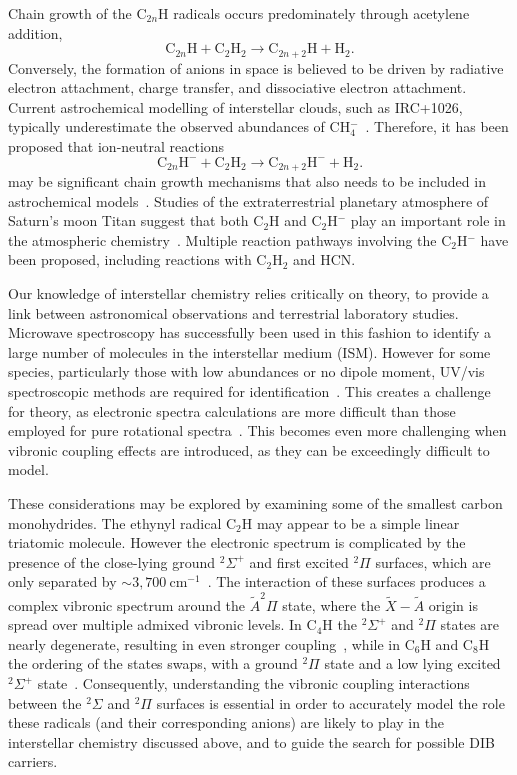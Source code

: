 \documentclass[journal=jpcafh,manuscript=article,layout=onecolumn, 12pt]{achemso}
\begin{document}
Chain growth of the C$_{2n}$H radicals occurs predominately through acetylene addition,
\begin{equation}
\text{C}_{2n}\text{H} + \text{C}_2\text{H}_2 \rightarrow \text{C}_{2n+2}\text{H}+\text{H}_2.
\end{equation}
Conversely, the formation of anions in space is believed to be driven by radiative electron attachment, charge transfer, and dissociative electron attachment. Current astrochemical modelling of interstellar clouds, such as IRC+1026, typically underestimate the observed abundances of CH$_4^-$~\cite{mil17,cor13,her08}. Therefore, it has been proposed that ion-neutral reactions
 \begin{equation}
	\text{C}_{2n}\text{H}^- + \text{C}_2\text{H}_2 \rightarrow \text{C}_{2n+2}\text{H}^- + \text{H}_2.
\end{equation}
may be significant chain growth mechanisms that also needs to be included in astrochemical models~\cite{mil17,bas19}. Studies of the extraterrestrial planetary atmosphere of Saturn's moon Titan suggest that both C$_2$H and C$_2$H$^-$ play an important role in the atmospheric chemistry~\cite{dob16,vui09,des17,vri18}. Multiple reaction pathways involving the C$_2$H$^-$ have been proposed, including reactions with C$_2$H$_2$ and HCN. 

Our knowledge of interstellar chemistry relies critically on theory, to provide a link between astronomical observations and terrestrial laboratory studies. Microwave spectroscopy has successfully been used in this fashion to identify a large number of molecules in the interstellar medium (ISM). However for some species, particularly those with low abundances or no dipole moment, UV/vis spectroscopic methods are required for identification~\cite{mai97}. This creates a challenge for theory, as electronic spectra calculations are more difficult than those employed for pure rotational spectra~\cite{for10}. This becomes even more challenging when vibronic coupling effects are introduced, as they can be exceedingly difficult to model.

These considerations may be explored by examining some of the smallest carbon monohydrides. The ethynyl radical C$_2$H may appear to be a simple linear triatomic molecule. However the electronic spectrum is complicated by the presence of the close-lying ground $^2\Sigma^+$ and first excited $^2\Pi$ surfaces, which are only separated by $\sim3,700~$cm$^{-1}$~\cite{cur85,tar03}. The interaction of these surfaces produces a complex vibronic spectrum around the $\tilde{A}^2\Pi$ state, where the $\tilde{X}-\tilde{A}$ origin is spread over multiple admixed vibronic levels. In C$_4$H the $^2\Sigma^+$ and $^2\Pi$ states are nearly degenerate, resulting in even stronger coupling~\cite{zho07}, while in C$_6$H and C$_8$H the ordering of the states swaps, with a ground $^2\Pi$ state and a low lying excited $^2\Sigma^+$ state~\cite{lin99,tay98}. Consequently, understanding the vibronic coupling interactions between the $^2\Sigma$ and $^2\Pi$ surfaces is essential in order to accurately model the role these radicals (and their corresponding anions) are likely to play in the interstellar chemistry discussed above, and to guide the search for possible DIB carriers.
\end{document}
